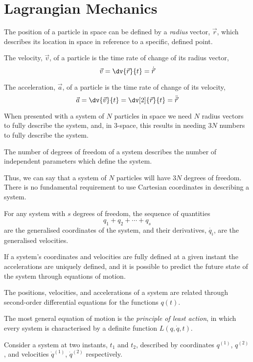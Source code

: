 \documentclass{mn2e}
\begin{document}
\section{Lagrangian Mechanics}
\label{sec:lagrangemex}

\begin{definition}[Position]
  The position of a particle in space can be defined by a
  \emph{radius} vector, $\vec{r}$, which describes its location in
  space in reference to a specific, defined point.
\end{definition}
\begin{definition}[Velocity]
  The velocity, $\vec{v}$, of a particle is the time rate of change of its radius vector,
\[ \vec{v} = \dv{\vec{r}}{t} = \dot{\vec{r}} \]
\end{definition}
\begin{definition}[Acceleration]
  The acceleration, $\vec{a}$, of a particle is the time rate of change of its velocity,
\[ \vec{a} = \dv{\vec{v}}{t} = \dv[2]{\vec{r}}{t} = \ddot{\vec{r}}\]
\end{definition}

When presented with a system of $N$ particles in space we need $N$
radius vectors to fully describe the system, and, in 3-space, this
results in needing $3N$ numbers to fully describe the system.

\begin{definition}
  The number of degrees of freedom of a system describes the number of
  independent parameters which define the system.
\end{definition}

Thus, we can say that a system of $N$ particles will have $3N$ degrees
of freedom. There is no fundamental requirement to use Cartesian
coordinates in describing a system.

\begin{definition}
  For any system with $s$ degrees of freedom, the sequence of quantities
  \[ q_1 + q_2 + \cdots + q_s \] are the generalised coordinates of
  the system, and their derivatives, $\dot{q_i}$, are the generalised
  velocities.
\end{definition}

If a system's coordinates and velocities are fully defined at a given
instant the accelerations are uniquely defined, and it is possible to
predict the future state of the system through equations of motion.

\begin{definition}
  The positions, velocities, and accelerations of a system are related
  through second-order differential equations for the functions $q(t)$.
\end{definition}
The most general equation of motion is the \emph{principle of least
  action}, in which every system is characterised by a definite
function $L(q, \dot{q},t)$.

\begin{definition}
  Consider a system at two instants, $t_1$ and $t_2$, described by
  coordinates $q^{(1)}$, $q^{(2)}$, and velocities $\dot{q}^{(1)}$,
  $\dot{q}^{(2)}$ respectively.
\end{definition}
\end{document}
